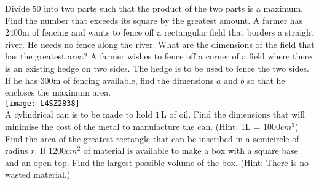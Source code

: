 \begin{Exercise}[title={Optimisation},label=exOptimisation]
	\Question Divide $50$ into two parts such that the product of the two parts is a maximum. %
	\Question Find the number that exceeds its square by the greatest amount. %
	\Question A farmer has $2400 \mbox{m}$ of fencing and wants to fence off a rectangular field that borders a straight river. He needs no fence along the river. What are the dimensions of the field that has the greatest area? %
	\clearpage
	\Question A farmer wishes to fence off a corner of a field where there is an existing hedge on two sides. The hedge is to be used to fence the two sides. If he has $300 \mbox{m}$ of fencing available, find the dimensions $a$ and $b$ so that he encloses the maximum area.\\ 
	 \texttt{[image: L4SZ2838]}\\ %
	\Question A cylindrical can is to be made to hold $1\,$L of oil. Find the dimensions that will minimise the cost of the metal to manufacture the can. (Hint: 1\thinspace L = $1000 cm^{3}$) %
	\Question Find the area of the greatest rectangle that can be inscribed in a semicircle	of radius $r$. %
	\Question If $1200 cm^{2}$ of material is available to make a box with a square base and an open top. Find the largest possible volume of the box. (Hint: There is no wasted material.) %

\end{Exercise}
